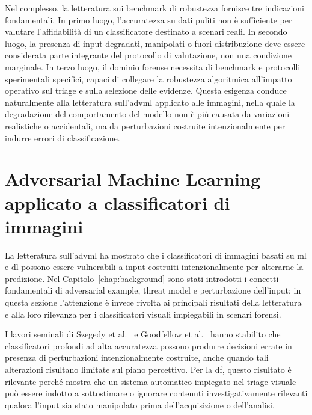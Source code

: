 Nel complesso, la letteratura sui benchmark di robustezza fornisce tre indicazioni fondamentali. In primo luogo, l'accuratezza su dati puliti non è sufficiente per valutare l'affidabilità di un classificatore destinato a scenari reali. In secondo luogo, la presenza di input degradati, manipolati o fuori distribuzione deve essere considerata parte integrante del protocollo di valutazione, non una condizione marginale. In terzo luogo, il dominio forense necessita di benchmark e protocolli sperimentali specifici, capaci di collegare la robustezza algoritmica all'impatto operativo sul triage e sulla selezione delle evidenze. Questa esigenza conduce naturalmente alla letteratura sull'\gls{advml} applicato alle immagini, nella quale la degradazione del comportamento del modello non è più causata da variazioni realistiche o accidentali, ma da perturbazioni costruite intenzionalmente per indurre errori di classificazione.

\section{Adversarial Machine Learning applicato a classificatori di immagini}
\label{sec:sota-adversarial-ml}

La letteratura sull'\gls{advml} ha mostrato che i classificatori di immagini
basati su \gls{ml} e \gls{dl} possono essere vulnerabili a input costruiti
intenzionalmente per alterarne la predizione. Nel
Capitolo~\ref{chap:background} sono stati introdotti i concetti fondamentali di
adversarial example, threat model e perturbazione dell'input; in questa sezione
l'attenzione è invece rivolta ai principali risultati della letteratura e alla
loro rilevanza per i classificatori visuali impiegabili in scenari forensi.

I lavori seminali di Szegedy et al.~\cite{szegedy2014intriguing} e Goodfellow
et al.~\cite{goodfellow2015explaining} hanno stabilito che classificatori
profondi ad alta accuratezza possono produrre decisioni errate in presenza di
perturbazioni intenzionalmente costruite, anche quando tali alterazioni risultano
limitate sul piano percettivo. Per la \gls{df}, questo risultato è rilevante
perché mostra che un sistema automatico impiegato nel triage visuale può essere
indotto a sottostimare o ignorare contenuti investigativamente rilevanti qualora
l'input sia stato manipolato prima dell'acquisizione o dell'analisi.

